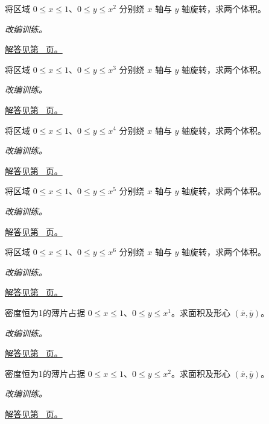 \documentclass[12pt,fontset=fandol]{ctexart}
\begin{document}
\begin{example}[同一区域绕不同轴旋转]\label{ex:c21q8}
将区域 $0\le x\le1$、$0\le y\le x^{2}$ 分别绕 $x$ 轴与 $y$ 轴旋转，求两个体积。
\par\textit{改编训练。}\par\hyperref[ans:c21q8]{解答见第~\pageref{ans:c21q8} 页。}
\end{example}
\begin{example}[同一区域绕不同轴旋转]\label{ex:c21q9}
将区域 $0\le x\le1$、$0\le y\le x^{3}$ 分别绕 $x$ 轴与 $y$ 轴旋转，求两个体积。
\par\textit{改编训练。}\par\hyperref[ans:c21q9]{解答见第~\pageref{ans:c21q9} 页。}
\end{example}
\begin{example}[同一区域绕不同轴旋转]\label{ex:c21q10}
将区域 $0\le x\le1$、$0\le y\le x^{4}$ 分别绕 $x$ 轴与 $y$ 轴旋转，求两个体积。
\par\textit{改编训练。}\par\hyperref[ans:c21q10]{解答见第~\pageref{ans:c21q10} 页。}
\end{example}
\begin{example}[同一区域绕不同轴旋转]\label{ex:c21q11}
将区域 $0\le x\le1$、$0\le y\le x^{5}$ 分别绕 $x$ 轴与 $y$ 轴旋转，求两个体积。
\par\textit{改编训练。}\par\hyperref[ans:c21q11]{解答见第~\pageref{ans:c21q11} 页。}
\end{example}
\begin{example}[同一区域绕不同轴旋转]\label{ex:c21q12}
将区域 $0\le x\le1$、$0\le y\le x^{6}$ 分别绕 $x$ 轴与 $y$ 轴旋转，求两个体积。
\par\textit{改编训练。}\par\hyperref[ans:c21q12]{解答见第~\pageref{ans:c21q12} 页。}
\end{example}
\begin{example}[曲边梯形的形心]\label{ex:c21q13}
密度恒为1的薄片占据 $0\le x\le1$、$0\le y\le x^{1}$。求面积及形心 $(\bar x,\bar y)$。
\par\textit{改编训练。}\par\hyperref[ans:c21q13]{解答见第~\pageref{ans:c21q13} 页。}
\end{example}
\begin{example}[曲边梯形的形心]\label{ex:c21q14}
密度恒为1的薄片占据 $0\le x\le1$、$0\le y\le x^{2}$。求面积及形心 $(\bar x,\bar y)$。
\par\textit{改编训练。}\par\hyperref[ans:c21q14]{解答见第~\pageref{ans:c21q14} 页。}
\end{example}
\end{document}
